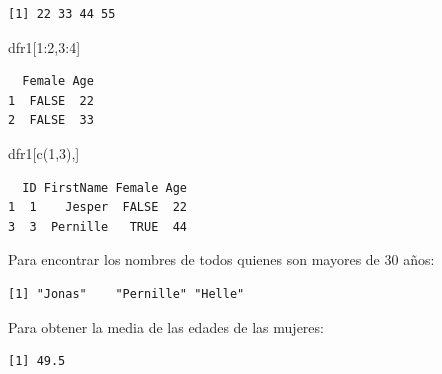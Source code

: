 \documentclass[
  letterpaper,
  DIV=11,
  numbers=noendperiod]{scrartcl}
\newenvironment{Shaded}{\begin{snugshade}}{\end{snugshade}}
\newcommand{\ConstantTok}[1]{\textcolor[rgb]{0.56,0.35,0.01}{#1}}
\newcommand{\DecValTok}[1]{\textcolor[rgb]{0.68,0.00,0.00}{#1}}
\newcommand{\FunctionTok}[1]{\textcolor[rgb]{0.28,0.35,0.67}{#1}}
\newcommand{\NormalTok}[1]{\textcolor[rgb]{0.00,0.23,0.31}{#1}}
\newcommand{\SpecialCharTok}[1]{\textcolor[rgb]{0.37,0.37,0.37}{#1}}
\begin{document}
\begin{verbatim}
[1] 22 33 44 55
\end{verbatim}

\begin{Shaded}
\begin{Highlighting}[]
\NormalTok{dfr1[}\DecValTok{1}\SpecialCharTok{:}\DecValTok{2}\NormalTok{,}\DecValTok{3}\SpecialCharTok{:}\DecValTok{4}\NormalTok{] }
\end{Highlighting}
\end{Shaded}

\begin{verbatim}
  Female Age
1  FALSE  22
2  FALSE  33
\end{verbatim}

\begin{Shaded}
\begin{Highlighting}[]
\NormalTok{dfr1[}\FunctionTok{c}\NormalTok{(}\DecValTok{1}\NormalTok{,}\DecValTok{3}\NormalTok{),] }
\end{Highlighting}
\end{Shaded}

\begin{verbatim}
  ID FirstName Female Age
1  1    Jesper  FALSE  22
3  3  Pernille   TRUE  44
\end{verbatim}

Para encontrar los nombres de todos quienes son mayores de 30 años:

\begin{Shaded}
\end{Shaded}

\begin{verbatim}
[1] "Jonas"    "Pernille" "Helle"   
\end{verbatim}

Para obtener la media de las edades de las mujeres:

\begin{Shaded}
\end{Shaded}

\begin{verbatim}
[1] 49.5
\end{verbatim}
\end{document}
